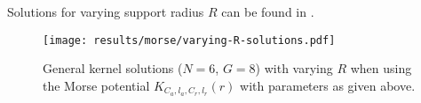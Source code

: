 Solutions for varying support radius $R$ can be found in .

\begin{figure}[H]
  \centering
  \texttt{[image: results/morse/varying-R-solutions.pdf]}
  \caption[Solutions with varying $R$]{General kernel solutions ($N = 6$, $G = 8$) with varying $R$ when using the Morse potential $K_{C_a, l_a, C_r, l_r}(r)$ with parameters as given above.}
  \label{fig:varying-R-solutions}
\end{figure}

